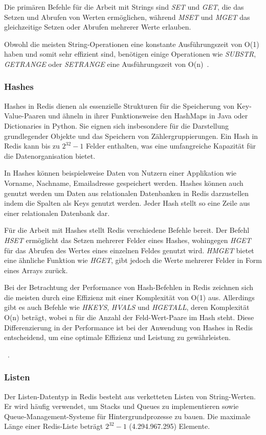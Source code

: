 Die primären Befehle für die Arbeit mit Strings sind \emph{SET} und \emph{GET}, die das Setzen und Abrufen von Werten ermöglichen, während \emph{MSET} und \emph{MGET} das gleichzeitige Setzen oder Abrufen mehrerer Werte erlauben.

Obwohl die meisten String-Operationen eine konstante Ausführungszeit von O(1) haben und somit sehr effizient sind, benötigen einige Operationen wie \emph{SUBSTR}, \emph{GETRANGE} oder \emph{SETRANGE} eine Ausführungszeit von O(n)~\cite{redis_ltd_strings_nodate}.

\subsubsection{Hashes}
Hashes in Redis dienen als essenzielle Strukturen für die Speicherung von Key-Value-Paaren und ähneln in ihrer Funktionsweise den HashMaps in Java oder Dictionaries in Python. Sie eignen sich insbesondere für die Darstellung grundlegender Objekte und das Speichern von Zählergruppierungen. Ein Hash in Redis kann bis zu \(2^{32} - 1\) Felder enthalten, was eine umfangreiche Kapazität für die Datenorganisation bietet.

In Hashes können beispielsweise Daten von Nutzern einer Applikation wie Vorname, Nachname, Emailadresse gespeichert werden.
Hashes können auch genutzt werden um Daten aus relationalen Datenbanken in Redis darzustellen indem die Spalten als Keys genutzt werden. Jeder Hash stellt so eine Zeile aus einer relationalen Datenbank dar.

Für die Arbeit mit Hashes stellt Redis verschiedene Befehle bereit. Der Befehl \emph{HSET} ermöglicht das Setzen mehrerer Felder eines Hashes, wohingegen \emph{HGET} für das Abrufen des Wertes eines einzelnen Feldes genutzt wird. \emph{HMGET} bietet eine ähnliche Funktion wie \emph{HGET}, gibt jedoch die Werte mehrerer Felder in Form eines Arrays zurück.

Bei der Betrachtung der Performance von Hash-Befehlen in Redis zeichnen sich die meisten durch eine Effizienz mit einer Komplexität von O(1) aus. Allerdings gibt es auch Befehle wie \emph{HKEYS}, \emph{HVALS} und \emph{HGETALL}, deren Komplexität O(n) beträgt, wobei n für die Anzahl der Feld-Wert-Paare im Hash steht. Diese Differenzierung in der Performance ist bei der Anwendung von Hashes in Redis entscheidend, um eine optimale Effizienz und Leistung zu gewährleisten.

~\cite{redis_ltd_hashes_nodate}.
\subsubsection{Listen}
Der Listen-Datentyp in Redis besteht aus verketteten Listen von String-Werten. Er wird häufig verwendet, um Stacks und Queues zu implementieren sowie Queue-Management-Systeme für Hintergrundprozesse zu bauen.
Die maximale Länge einer Redis-Liste beträgt \(2^{32} - 1\) (4.294.967.295) Elemente.

